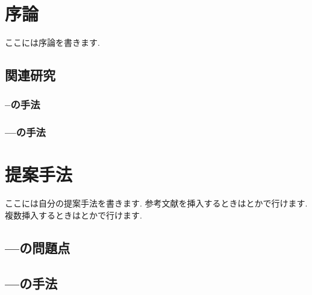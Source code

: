 \documentclass[12pt,a4j]{jreport}
\begin{document}
\thispagestyle{empty}
\clearpage


\tableofcontents
\listoffigures
\listoftables

\pagestyle{fancy}
\lhead{\leftmark}
\rhead{}
\renewcommand{\chaptermark}[1]{\markboth{第\ \normalfont\thechapter\ 章~~#1}{}}


\chapter{序論} %
ここには序論を書きます.

\section{関連研究} %
\subsection{--の手法} %
\subsection{---の手法} %



\chapter{提案手法}
ここには自分の提案手法を書きます.
参考文献を挿入するときは\cite{hotta2008robust}とかで行けます.
複数挿入するときは\cite{hotta2008robust, 大津展之1980判別および最小}とかで行けます.

\section{---の問題点}
\section{---の手法}
\end{document}
